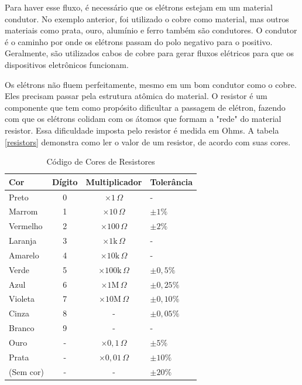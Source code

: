 \documentclass[lang=pt,11pt]{elegantbook}
\begin{document}
Para haver esse fluxo, é necessário que os elétrons estejam em um material condutor. No exemplo anterior, foi utilizado o cobre como material, mas outros materiais como prata, ouro, alumínio e ferro também são condutores. O condutor é o caminho por onde os elétrons passam do polo negativo para o positivo. Geralmente, são utilizados cabos de cobre para gerar fluxos elétricos para que os dispositivos eletrônicos funcionam.

Os elétrons não fluem perfeitamente, mesmo em um bom condutor como o cobre. Eles precisam passar pela estrutura atômica do material. O resistor é um componente que tem como propósito dificultar a passagem de elétron, fazendo com que os elétrons colidam com os átomos que formam a "rede" do material resistor. Essa dificuldade imposta pelo resistor é medida em Ohms. A tabela \ref{resistors} demonstra como ler o valor de um resistor, de acordo com suas cores.

\begin{table}[htbp]
	\centering
	\caption{Código de Cores de Resistores}
	\begin{tabular}{lccl}
	\toprule
	\textbf{Cor} & \textbf{Dígito} & \textbf{Multiplicador} & \textbf{Tolerância} \\ 
    \midrule
	Preto   & 0 & $\times 1\,\Omega$ & - \\ 
	Marrom  & 1 & $\times 10\,\Omega$ & $\pm 1\%$ \\ 
	Vermelho& 2 & $\times 100\,\Omega$ & $\pm 2\%$ \\ 
	Laranja & 3 & $\times 1\text{k}\,\Omega$ & - \\ 
	Amarelo & 4 & $\times 10\text{k}\,\Omega$ & - \\ 
	Verde   & 5 & $\times 100\text{k}\,\Omega$ & $\pm 0,5\%$ \\ 
	Azul    & 6 & $\times 1\text{M}\,\Omega$ & $\pm 0,25\%$ \\ 
	Violeta & 7 & $\times 10\text{M}\,\Omega$ & $\pm 0,10\%$ \\ 
	Cinza   & 8 & - & $\pm 0,05\%$ \\ 
	Branco  & 9 & - & - \\ 
	Ouro    & - & $\times 0,1\,\Omega$ & $\pm 5\%$ \\ 
	Prata   & - & $\times 0,01\,\Omega$ & $\pm 10\%$ \\ 
	(Sem cor)& - & - & $\pm 20\%$ \\ 
    \bottomrule
	\end{tabular}
	\label{tab:resistors}
\end{table}
\end{document}
